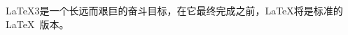 \documentclass{book}
\begin{document}
    \LaTeX3是一个长远而艰巨的奋斗目标，在它最终完成之前，\LaTeX{}将是标准的\LaTeX\ 版本。
\end{document}
